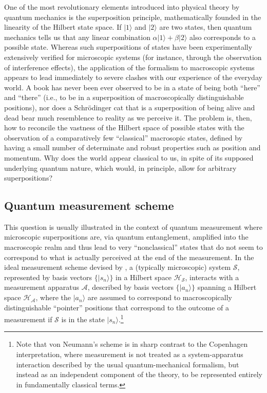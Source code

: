 \documentclass[rmp,aps,amsmath,amsfonts,noshowkeys,noshowpacs,12pt]{revtex4}
\newcommand{\ket}[1]{\ensuremath{|{#1\rangle}}}
\begin{document}
One of the most revolutionary elements introduced into physical theory
by quantum mechanics is the superposition principle, mathematically
founded in the linearity of the Hilbert state space. If $\ket{1}$ and
$\ket{2}$ are two states, then quantum mechanics tells us that any
linear combination $\alpha \ket{1} + \beta \ket{2}$ also corresponds
to a possible state. Whereas such superpositions of states have been
experimentally extensively verified for microscopic systems (for
instance, through the observation of interference effects), the
application of the formalism to macroscopic systems appears to lead
immediately to severe clashes with our experience of the everyday
world. A book has never been ever observed to be in a state of being
both ``here'' and ``there'' (i.e., to be in a superposition of
macroscopically distinguishable positions), nor does a Schr\"odinger
cat that is a superposition of being alive and dead bear much
resemblence to reality as we perceive it.  The problem is, then, how
to reconcile the vastness of the Hilbert space of possible states with
the observation of a comparatively few ``classical'' macrosopic
states, defined by having a small number of determinate and robust
properties such as position and momentum. Why does the world appear
classical to us, in spite of its supposed underlying quantum nature,
which would, in principle, allow for arbitrary superpositions?


\subsection{Quantum measurement scheme}

This question is usually illustrated in the context of quantum
measurement where microscopic superpositions are, via quantum
entanglement, amplified into the macroscopic realm and thus lead to
very ``nonclassical'' states that do not seem to correspond to what is
actually perceived at the end of the measurement. In the ideal
measurement scheme devised by \citet{Neumann:1932:gq}, a (typically
microscopic) system $\mathcal{S}$, represented by basis vectors $\{
\ket{s_n} \}$ in a Hilbert space $\mathcal{H}_{\mathcal{S}}$,
interacts with a measurement apparatus $\mathcal{A}$, described by
basis vectors $\{ \ket{a_n} \}$ spanning a Hilbert space
$\mathcal{H}_{\mathcal{A}}$, where the $\ket{a_n}$ are assumed to
correspond to macroscopically distinguishable ``pointer'' positions
that correspond to the outcome of a measurement if $\mathcal{S}$ is in
the state $\ket{s_n}$.\footnote{Note that von Neumann's scheme is in
  sharp contrast to the Copenhagen interpretation, where measurement
  is not treated as a system-apparatus interaction described by the
  usual quantum-mechanical formalism, but instead as an independent
  component of the theory, to be represented entirely in fundamentally
  classical terms.}
\end{document}
